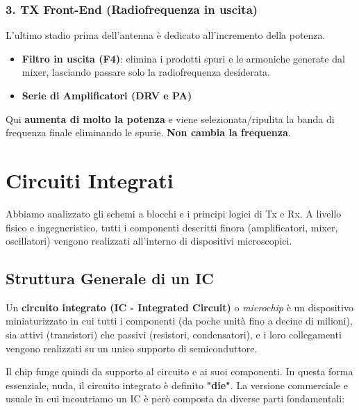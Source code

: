 \documentclass[openany,a4paper,12pt]{book}
\begin{document}
\subsubsection*{3. TX Front-End (Radiofrequenza in uscita)}
L'ultimo stadio prima dell'antenna è dedicato all'incremento della potenza.
\begin{itemize}[label=\textcolor{ForestGreen}{\textbullet}]
    \item \textbf{Filtro in uscita (F4)}: elimina i prodotti spuri e le armoniche generate dal mixer, lasciando passare solo la radiofrequenza desiderata.
    \item \textbf{Serie di Amplificatori (DRV e PA)}
\end{itemize}
\begin{nota}[colback=ForestGreen!5, colframe=ForestGreen, title={\textbf{Cosa succede nel TX Front-End?}}]
    Qui \textbf{aumenta di molto la potenza} e viene selezionata/ripulita la banda di frequenza finale eliminando le spurie. \textbf{Non cambia la frequenza}.
\end{nota}



\section{Circuiti Integrati}

Abbiamo analizzato gli schemi a blocchi e i principi logici di Tx e Rx. A livello fisico e ingegneristico, tutti i componenti descritti finora (amplificatori, mixer, oscillatori) vengono realizzati all'interno di dispositivi microscopici.

\subsection*{Struttura Generale di un IC}

Un \textbf{circuito integrato (IC - Integrated Circuit)} o \textit{microchip} è un dispositivo miniaturizzato in cui tutti i componenti (da poche unità fino a decine di milioni), sia attivi (transistori) che passivi (resistori, condensatori), e i loro collegamenti vengono realizzati su un unico supporto di semiconduttore. 

Il chip funge quindi da supporto al circuito e ai suoi componenti. In questa forma essenziale, nuda, il circuito integrato è definito \textbf{"die"}. 
La versione commerciale e usuale in cui incontriamo un IC è però composta da diverse parti fondamentali:
\end{document}

